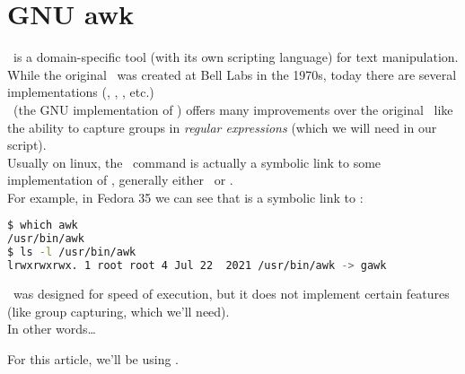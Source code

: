 
\renewcommand{\currentPart}{GNU awk} 

\newpage
\part{GNU awk} \label{awk}

\awk\ is a domain-specific tool (with its own scripting language) for text manipulation. While the original \awk\ was created at Bell Labs in the 1970s, today there are several implementations (, , , etc.) \\


\gawk\ (the GNU implementation of \awk) offers many improvements over the original \awk\, like the ability to capture groups in \emph{regular expressions} (which we will need in our script). \\

Usually on linux, the \ command is actually a symbolic link to some implementation of \awk, generally either \gawk\ or \mawk. \\

For example, in Fedora 35 we can see that  is a symbolic link to  :
\begin{lstlisting}[language=sh]
$ which awk
/usr/bin/awk
$ ls -l /usr/bin/awk
lrwxrwxrwx. 1 root root 4 Jul 22  2021 /usr/bin/awk -> gawk
\end{lstlisting}

\bigskip



\mawk\ was designed for speed of execution, but it does not implement certain features (like group capturing, which we'll need). \\

In other words\dots
{}

For this article, we'll be using \gawk. \\



